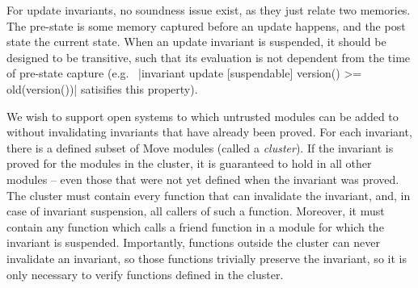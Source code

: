 For update invariants, no soundness issue exist, as they just relate two
memories.  The pre-state is some memory captured before an update happens, and
the post state the current state. When an update invariant is suspended, it
should be designed to be transitive, such that its evaluation is not dependent
from the time of pre-state capture (e.g.~%
|invariant update [suspendable] version() >= old(version())| satisifies this
property).







We wish to support open systems to which untrusted modules can be added to
without invalidating invariants that have already been proved. For each
invariant, there is a defined subset of Move modules (called a
\textit{cluster}). If the invariant is proved for the modules in the cluster, it
is guaranteed to hold in all other modules -- even those that were not yet
defined when the invariant was proved.  The cluster must contain every function
that can invalidate the invariant, and, in case of invariant suspension, all
callers of such a function.  Moreover, it must contain any function which calls
a friend function in a module for which the invariant is suspended. Importantly,
functions outside the cluster can never invalidate an invariant, so those
functions trivially preserve the invariant, so it is only necessary to verify
functions defined in the cluster.

